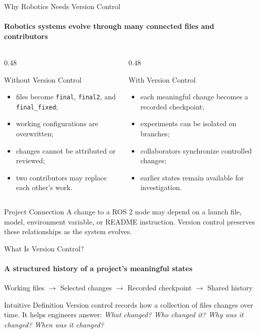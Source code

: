 \begin{frame}{Why Robotics Needs Version Control}
\framesubtitle{Robotics systems evolve through many connected files and contributors}
\footnotesize
\begin{columns}[T,onlytextwidth]
\begin{column}{0.48\textwidth}
\begin{block}{Without Version Control}
\begin{itemize}\setlength{\itemsep}{0.2em}
\item files become \texttt{final}, \texttt{final2}, and \texttt{final\_fixed};
\item working configurations are overwritten;
\item changes cannot be attributed or reviewed;
\item two contributors may replace each other's work.
\end{itemize}
\end{block}
\end{column}
\begin{column}{0.48\textwidth}
\begin{exampleblock}{With Version Control}
\begin{itemize}\setlength{\itemsep}{0.2em}
\item each meaningful change becomes a recorded checkpoint;
\item experiments can be isolated on branches;
\item collaborators synchronize controlled changes;
\item earlier states remain available for investigation.
\end{itemize}
\end{exampleblock}
\end{column}
\end{columns}
\begin{alertblock}{Project Connection}
A change to a ROS 2 node may depend on a launch file, model, environment variable, or README instruction. Version control preserves these relationships as the system evolves.
\end{alertblock}
\end{frame}

\begin{frame}{What Is Version Control?}
\framesubtitle{A structured history of a project's meaningful states}
\footnotesize
\begin{center}
Working files $\longrightarrow$ Selected changes $\longrightarrow$ Recorded checkpoint $\longrightarrow$ Shared history
\end{center}
\begin{block}{Intuitive Definition}
Version control records how a collection of files changes over time. It helps engineers answer: \emph{What changed? Who changed it? Why was it changed? When was it changed?}
\end{block}

\end{frame}






